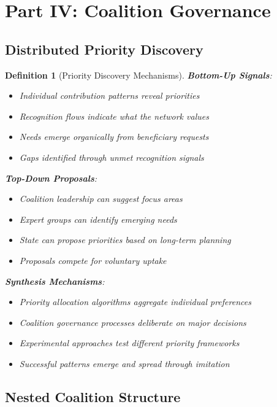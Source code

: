 \documentclass[11pt]{article}
\newtheorem{definition}{Definition}
\begin{document}
\section{Part IV: Coalition Governance}

\subsection{Distributed Priority Discovery}

\begin{definition}[Priority Discovery Mechanisms]
\textbf{Bottom-Up Signals}:
\begin{itemize}
\item Individual contribution patterns reveal priorities
\item Recognition flows indicate what the network values
\item Needs emerge organically from beneficiary requests
\item Gaps identified through unmet recognition signals
\end{itemize}

\textbf{Top-Down Proposals}:
\begin{itemize}
\item Coalition leadership can suggest focus areas
\item Expert groups can identify emerging needs
\item State can propose priorities based on long-term planning
\item Proposals compete for voluntary uptake
\end{itemize}

\textbf{Synthesis Mechanisms}:
\begin{itemize}
\item Priority allocation algorithms aggregate individual preferences
\item Coalition governance processes deliberate on major decisions
\item Experimental approaches test different priority frameworks
\item Successful patterns emerge and spread through imitation
\end{itemize}
\end{definition}

\subsection{Nested Coalition Structure}
\end{document}
